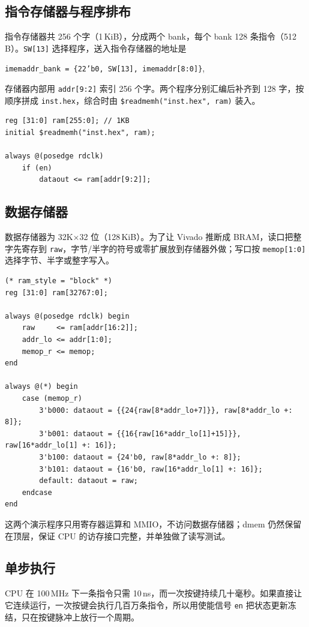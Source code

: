 \documentclass[12pt, a4paper]{ctexart}
\begin{document}
\subsection{指令存储器与程序排布}
指令存储器共 256 个字（1\,KiB），分成两个 bank，每个 bank 128 条指令（512\,B）。\texttt{SW[13]} 选择程序，送入指令存储器的地址是
\begin{center}
    \texttt{imemaddr\_bank = \{22'b0, SW[13], imemaddr[8:0]\}},
\end{center}
存储器内部用 \texttt{addr[9:2]} 索引 256 个字。两个程序分别汇编后补齐到 128 字，按顺序拼成 \texttt{inst.hex}，综合时由 \texttt{\$readmemh("inst.hex", ram)} 装入。

\begin{lstlisting}
reg [31:0] ram[255:0]; // 1KB
initial $readmemh("inst.hex", ram);

always @(posedge rdclk)
    if (en)
        dataout <= ram[addr[9:2]];
\end{lstlisting}

\subsection{数据存储器}
数据存储器为 32K$\times$32 位（128\,KiB）。为了让 Vivado 推断成 BRAM，读口把整字先寄存到 \texttt{raw}，字节/半字的符号或零扩展放到存储器外做；写口按 \texttt{memop[1:0]} 选择字节、半字或整字写入。

\begin{lstlisting}
(* ram_style = "block" *)
reg [31:0] ram[32767:0];

always @(posedge rdclk) begin
    raw     <= ram[addr[16:2]];
    addr_lo <= addr[1:0];
    memop_r <= memop;
end

always @(*) begin
    case (memop_r)
        3'b000: dataout = {{24{raw[8*addr_lo+7]}}, raw[8*addr_lo +: 8]};
        3'b001: dataout = {{16{raw[16*addr_lo[1]+15]}}, raw[16*addr_lo[1] +: 16]};
        3'b100: dataout = {24'b0, raw[8*addr_lo +: 8]};
        3'b101: dataout = {16'b0, raw[16*addr_lo[1] +: 16]};
        default: dataout = raw;
    endcase
end
\end{lstlisting}

\noindent 这两个演示程序只用寄存器运算和 MMIO，不访问数据存储器；dmem 仍然保留在顶层，保证 CPU 的访存接口完整，并单独做了读写测试。

\subsection{单步执行}
CPU 在 100\,MHz 下一条指令只需 10\,ns，而一次按键持续几十毫秒。如果直接让它连续运行，一次按键会执行几百万条指令，所以用使能信号 \texttt{en} 把状态更新冻结，只在按键脉冲上放行一个周期。
\end{document}
